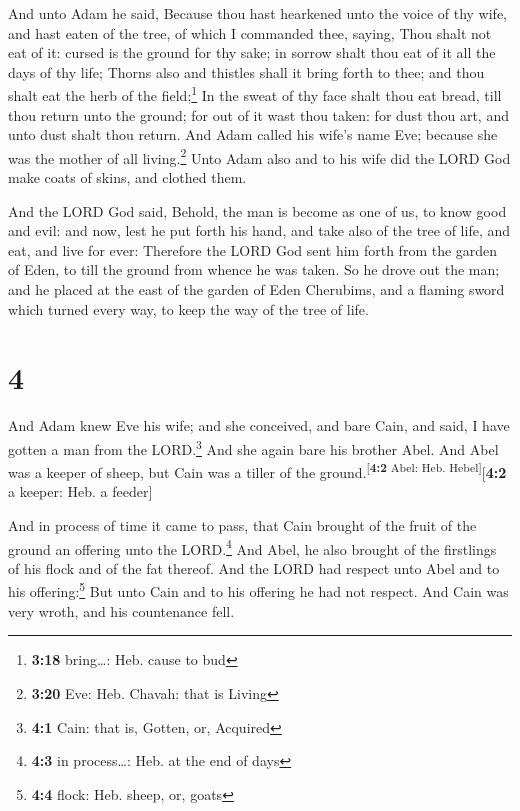  And unto Adam he said, Because thou hast hearkened unto
the voice of thy wife, and hast eaten of the tree, of which I commanded
thee, saying, Thou shalt not eat of it: cursed is the ground for thy
sake; in sorrow shalt thou eat of it all the days of thy life;
 Thorns also and thistles shall it bring forth to thee;
and thou shalt eat the herb of the field;\footnote{\textbf{3:18}
  bring\ldots: Heb. cause to bud}  In the sweat of thy
face shalt thou eat bread, till thou return unto the ground; for out of
it wast thou taken: for dust thou art, and unto dust shalt thou return.
 And Adam called his wife's name Eve; because she was the
mother of all living.\footnote{\textbf{3:20} Eve: Heb. Chavah: that is
  Living}  Unto Adam also and to his wife did the LORD
God make coats of skins, and clothed them.

 And the LORD God said, Behold, the man is become as one
of us, to know good and evil: and now, lest he put forth his hand, and
take also of the tree of life, and eat, and live for ever:
 Therefore the LORD God sent him forth from the garden of
Eden, to till the ground from whence he was taken.  So he
drove out the man; and he placed at the east of the garden of Eden
Cherubims, and a flaming sword which turned every way, to keep the way
of the tree of life.

\hypertarget{section-3}{%
\section{4}\label{section-3}}

 And Adam knew Eve his wife; and she conceived, and bare
Cain, and said, I have gotten a man from the LORD.\footnote{\textbf{4:1}
  Cain: that is, Gotten, or, Acquired}  And she again bare
his brother Abel. And Abel was a keeper of sheep, but Cain was a tiller
of the ground.\textsuperscript{{[}\textbf{4:2} Abel: Heb.
Hebel{]}}{[}\textbf{4:2} a keeper: Heb. a feeder{]}

 And in process of time it came to pass, that Cain brought
of the fruit of the ground an offering unto the LORD.\footnote{\textbf{4:3}
  in process\ldots: Heb. at the end of days}  And Abel, he
also brought of the firstlings of his flock and of the fat thereof. And
the LORD had respect unto Abel and to his offering:\footnote{\textbf{4:4}
  flock: Heb. sheep, or, goats}  But unto Cain and to his
offering he had not respect. And Cain was very wroth, and his
countenance fell.

